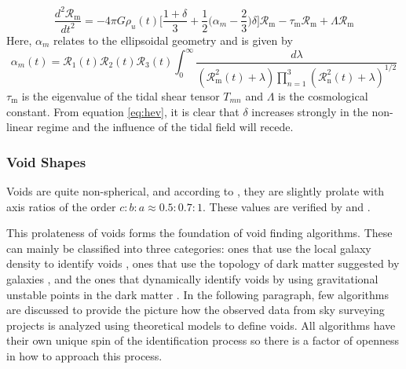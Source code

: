 \documentclass[fleqn,usenatbib]{mnras}
\begin{document}
\begin{equation}\label{eq:hev}
	\dfrac{d^2 \mathcal{R}_\textrm{m}}{dt^2} = -4 \pi G \rho_u (t) \Bigg[\dfrac{1+\delta}{3} + \dfrac{1}{2}\Bigg(\alpha_m - \dfrac{2}{3} \Bigg)\delta \Bigg] \mathcal{R}_\textrm{m} - \tau_\textrm{m} \mathcal{R}_\textrm{m} + \Lambda \mathcal{R}_\textrm{m}
\end{equation}
Here, $ \alpha_m $ relates to the ellipsoidal geometry and is given by
\begin{equation}\label{key}
	\alpha_m (t) = \mathcal{R}_1 (t) \mathcal{R}_2 (t) \mathcal{R}_3 (t) \int_0^{\infty} \dfrac{d \lambda}{(\mathcal{R}_\textrm{m}^2 (t)+\lambda) \prod_{n=1}^{3} (\mathcal{R}_\textrm{n}^2 (t)+\lambda)^{1/2}}
\end{equation}
$ \tau_\textrm{m} $ is the eigenvalue of the tidal shear tensor $ T_{mn} $ and $ \Lambda $ is the cosmological constant. From equation \ref{eq:hev}, it is clear that $ \delta $ increases strongly in the non-linear regime and the influence of the tidal field will recede.

\subsubsection{Void Shapes}
Voids are quite non-spherical, and according to \cite{platen_alignment_2008}, they are slightly prolate with axis ratios of the order $ c : b : a \approx 0.5 : 0.7 : 1 $.  These values are verified by \cite{shandarin_shapes_2006} and \cite{park_void_2007}. 

This prolateness of voids forms the foundation of void finding algorithms. These can mainly be classified into three categories: ones that use the local galaxy density to identify voids \citep{hoyle_voids_2002}, ones that use the topology of dark matter suggested by galaxies \citep{colberg_voids_2005}, and the ones that dynamically identify voids by using gravitational unstable points in the dark matter \citep{hahn_properties_2007}. In the following paragraph, few algorithms are discussed to provide the picture how the observed data from sky surveying projects is analyzed using theoretical models to define voids. All algorithms have their own unique spin of the identification process so there is a factor of openness in how to approach this process.
\end{document}

